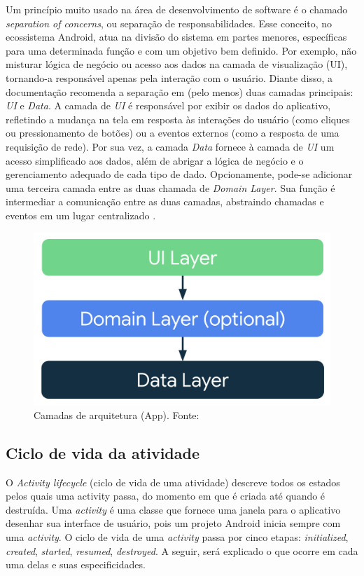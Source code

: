 Um princípio muito usado na área de desenvolvimento de software é o chamado \textit{separation of concerns}, ou separação de responsabilidades. Esse conceito, no ecossistema Android,
atua na divisão do sistema em partes menores, específicas para uma determinada função e com um objetivo bem definido. Por exemplo, não misturar lógica de 
negócio ou acesso aos dados na camada de visualização (UI), tornando-a  responsável apenas pela interação com o usuário. Diante disso, a documentação recomenda a separação em (pelo menos)
duas camadas principais: \textit{UI} e \textit{Data}. A camada de \textit{UI} é responsável por exibir os dados do aplicativo, refletindo a mudança na tela em resposta às
interações do usuário (como cliques ou pressionamento de botões) ou a eventos externos (como a resposta de uma requisição de rede). Por sua vez, a camada \textit{Data} fornece à camada de \textit{UI} 
um acesso simplificado aos dados, além de abrigar a lógica de negócio e o gerenciamento adequado de cada tipo de dado. Opcionamente, pode-se adicionar uma terceira camada entre as duas chamada de \textit{Domain Layer}.
Sua função é intermediar a comunicação entre as duas camadas, abstraindo chamadas e eventos em um lugar centralizado \cite{google-developers-guideline}.

\begin{figure}[ht]
    \centering
    \includegraphics[width=.73\textwidth]{img/app-android-layers.png}
    \caption{Camadas de arquitetura (App). Fonte:\cite{google-developers-guideline}}\label{figAppLayer}
\end{figure}

\subsection{Ciclo de vida da atividade}\label{ciclo-de-vida}

O \textit{Activity lifecycle} (ciclo de vida de uma atividade) descreve todos os estados pelos quais uma activity passa, do momento em que é criada
até quando é destruída. Uma \textit{activity} é uma classe que fornece uma janela para o aplicativo desenhar sua interface de usuário, pois um projeto Android 
inicia sempre com uma \textit{activity}. O ciclo de vida de uma \textit{activity} passa por cinco etapas: 
\textit{initialized}, \textit{created}, \textit{started}, \textit{resumed}, \textit{destroyed}. A seguir, será explicado o que ocorre em cada 
uma delas e suas especificidades.

